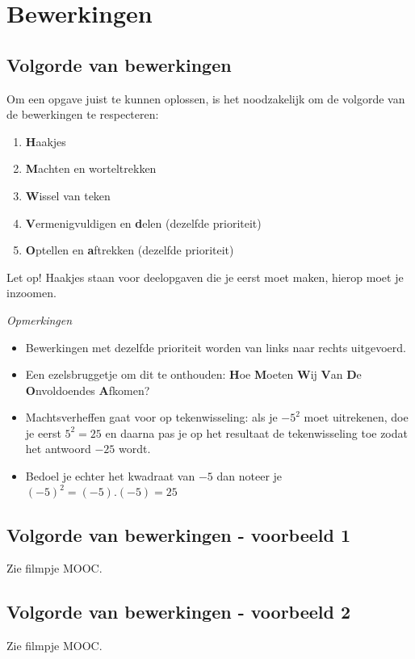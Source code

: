 \section{Bewerkingen}

\subsection{Volgorde van bewerkingen}
Om een opgave juist te kunnen oplossen, is het noodzakelijk om de volgorde van de bewerkingen te respecteren:

\begin{enumerate}
	\item \textbf{H}aakjes
	\item \textbf{M}achten en worteltrekken
	\item \textbf{W}issel van teken
	\item \textbf{V}ermenigvuldigen en \textbf{d}elen (dezelfde prioriteit)
	\item \textbf{O}ptellen en \textbf{a}ftrekken (dezelfde prioriteit)
\end{enumerate}

Let op! Haakjes staan voor deelopgaven die je eerst moet maken, hierop moet je inzoomen.

\emph{Opmerkingen}
\begin{itemize}
	\item Bewerkingen met dezelfde prioriteit worden van links naar rechts uitgevoerd.
	\item Een ezelsbruggetje om dit te onthouden: \textbf{H}oe \textbf{M}oeten \textbf{W}ij \textbf{V}an \textbf{D}e \textbf{O}nvoldoendes \textbf{A}fkomen?
	\item Machtsverheffen gaat voor op tekenwisseling: als je $-5^2$ moet uitrekenen, doe je eerst $5^2=25$ en daarna pas je op het resultaat de tekenwisseling toe zodat het antwoord $-25$ wordt.
	\item Bedoel je echter het kwadraat van $-5$ dan noteer je $(-5)^2=(-5).(-5)=25$
\end{itemize}

\subsection{Volgorde van bewerkingen - voorbeeld 1}
Zie filmpje MOOC.

\subsection{Volgorde van bewerkingen - voorbeeld 2}
Zie filmpje MOOC.

